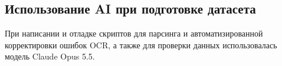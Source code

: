 \documentclass[
  russian,
]{article}
\begin{document}
\subsection{Использование AI при подготовке
датасета}\label{ux438ux441ux43fux43eux43bux44cux437ux43eux432ux430ux43dux438ux435-ai-ux43fux440ux438-ux43fux43eux434ux433ux43eux442ux43eux432ux43aux435-ux434ux430ux442ux430ux441ux435ux442ux430}

При написании и отладке скриптов для парсинга и автоматизированной
корректировки ошибок OCR, а также для проверки данных использовалась
модель Claude Opus 5.5.
\end{document}
